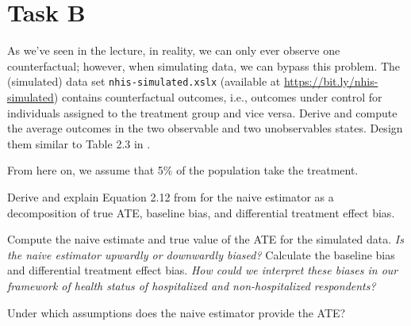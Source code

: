 \section*{Task B}

\begin{boenumerate}
  \item As we've seen in the lecture, in reality, we can only ever observe one counterfactual; however, when simulating data, we can bypass this problem. The (simulated) data set  \texttt{nhis-simulated.xslx} (available at \url{https://bit.ly/nhis-simulated}) contains counterfactual outcomes, i.e., outcomes under control for individuals assigned to the treatment group and vice versa. Derive and compute the average outcomes in the two observable and two unobservables states. Design them similar to Table 2.3 in \cite{Morgan.2014}.

\end{boenumerate}

\noindent From here on, we assume that 5$\%$ of the population take the treatment.

\begin{boenumerate}\setcounter{enumi}{1}

\item Derive and explain Equation 2.12 from \cite{Morgan.2014} for the naive estimator as a decomposition of true ATE, baseline bias, and differential treatment effect bias.

\item Compute the naive estimate and true value of the ATE for the simulated data. \textit{Is the naive estimator upwardly or downwardly biased?} Calculate the baseline bias and differential treatment effect bias. \textit{How could we interpret these biases in our framework of health status of hospitalized and  non-hospitalized respondents?}

\item Under which assumptions does the naive estimator provide the ATE?

\end{boenumerate}

\nocite{Angrist.2008}
\nocite{NHIS}





